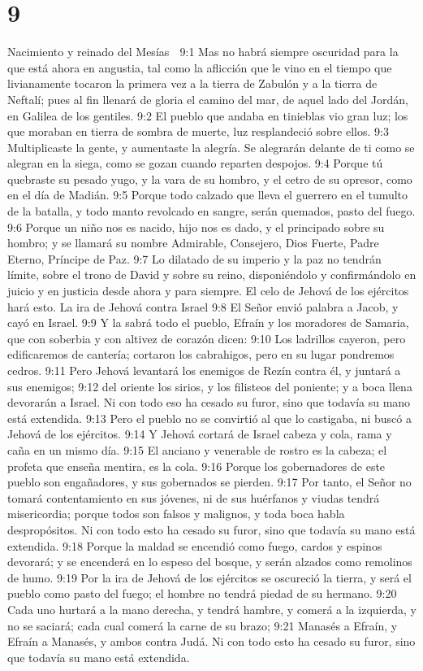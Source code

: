 \chapter{9}

Nacimiento y reinado del Mesías  

9:1 Mas no habrá siempre oscuridad para la que está ahora en angustia, tal como la aflicción que le vino en el tiempo que livianamente tocaron la primera vez a la tierra de Zabulón y a la tierra de Neftalí; pues al fin llenará de gloria el camino del mar, de aquel lado del Jordán, en Galilea de los gentiles. 
9:2 El pueblo que andaba en tinieblas vio gran luz; los que moraban en tierra de sombra de muerte, luz resplandeció sobre ellos. 
9:3 Multiplicaste la gente, y aumentaste la alegría. Se alegrarán delante de ti como se alegran en la siega, como se gozan cuando reparten despojos.  
9:4 Porque tú quebraste su pesado yugo, y la vara de su hombro, y el cetro de su opresor, como en el día de Madián.  
9:5 Porque todo calzado que lleva el guerrero en el tumulto de la batalla, y todo manto revolcado en sangre, serán quemados, pasto del fuego.  
9:6 Porque un niño nos es nacido, hijo nos es dado, y el principado sobre su hombro; y se llamará su nombre Admirable, Consejero, Dios Fuerte, Padre Eterno, Príncipe de Paz.  
9:7 Lo dilatado de su imperio y la paz no tendrán límite, sobre el trono de David y sobre su reino, disponiéndolo y confirmándolo en juicio y en justicia desde ahora y para siempre. El celo de Jehová de los ejércitos hará esto.  
La ira de Jehová contra Israel  
9:8 El Señor envió palabra a Jacob, y cayó en Israel.  
9:9 Y la sabrá todo el pueblo, Efraín y los moradores de Samaria, que con soberbia y con altivez de corazón dicen:  
9:10 Los ladrillos cayeron, pero edificaremos de cantería; cortaron los cabrahigos, pero en su lugar pondremos cedros.  
9:11 Pero Jehová levantará los enemigos de Rezín contra él, y juntará a sus enemigos;  
9:12 del oriente los sirios, y los filisteos del poniente; y a boca llena devorarán a Israel. Ni con todo eso ha cesado su furor, sino que todavía su mano está extendida.  
9:13 Pero el pueblo no se convirtió al que lo castigaba, ni buscó a Jehová de los ejércitos.  
9:14 Y Jehová cortará de Israel cabeza y cola, rama y caña en un mismo día.  
9:15 El anciano y venerable de rostro es la cabeza; el profeta que enseña mentira, es la cola.  
9:16 Porque los gobernadores de este pueblo son engañadores, y sus gobernados se pierden.  
9:17 Por tanto, el Señor no tomará contentamiento en sus jóvenes, ni de sus huérfanos y viudas tendrá misericordia; porque todos son falsos y malignos, y toda boca habla despropósitos. Ni con todo esto ha cesado su furor, sino que todavía su mano está extendida.  
9:18 Porque la maldad se encendió como fuego, cardos y espinos devorará; y se encenderá en lo espeso del bosque, y serán alzados como remolinos de humo.  
9:19 Por la ira de Jehová de los ejércitos se oscureció la tierra, y será el pueblo como pasto del fuego; el hombre no tendrá piedad de su hermano.  
9:20 Cada uno hurtará a la mano derecha, y tendrá hambre, y comerá a la izquierda, y no se saciará; cada cual comerá la carne de su brazo;  
9:21 Manasés a Efraín, y Efraín a Manasés, y ambos contra Judá. Ni con todo esto ha cesado su furor, sino que todavía su mano está extendida.  

